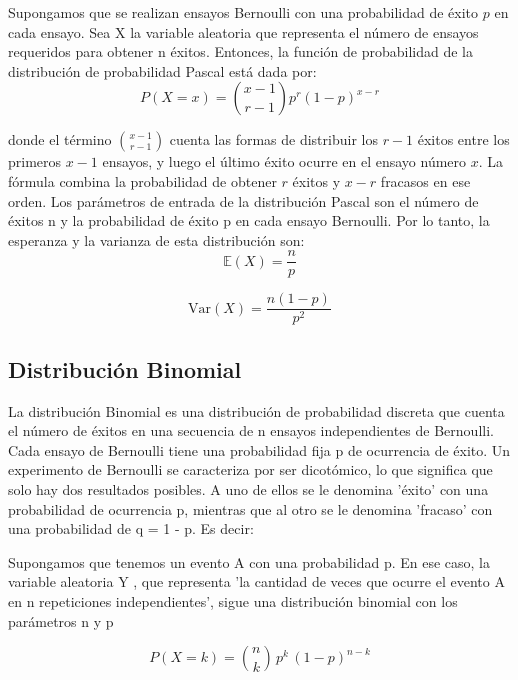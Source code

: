 \documentclass{article}
\begin{document}
 Supongamos que se realizan ensayos Bernoulli con una probabilidad de éxito $p$ en cada ensayo. Sea X la variable aleatoria que representa el número de ensayos requeridos para obtener n éxitos. Entonces, la función de probabilidad de la distribución de probabilidad Pascal está dada por:
\begin{equation}
    P(X = x) = \binom{x - 1}{r - 1} p^r (1 - p)^{x - r}
\end{equation}

donde el término $\binom{x - 1}{r - 1}$ cuenta las formas de distribuir los $r - 1$ éxitos entre los primeros $x - 1$ ensayos, y luego el último éxito ocurre en el ensayo número $x$. La fórmula combina la probabilidad de obtener $r$ éxitos y $x - r$ fracasos en ese orden.
Los parámetros de entrada de la distribución Pascal son el número de éxitos n y la probabilidad de éxito p en cada ensayo Bernoulli. Por lo tanto, la esperanza y la varianza de esta distribución son:
\begin{equation}
    \mathbb{E}(X) = \frac{n}{p}
\end{equation}

\begin{equation}
    \mathrm{Var}(X) = \frac{n(1 - p)}{p^2}
\end{equation}

\subsection{Distribución Binomial}
La distribución Binomial es una distribución de probabilidad discreta que cuenta el número de éxitos en una secuencia de n ensayos independientes de Bernoulli. Cada ensayo de Bernoulli tiene una probabilidad fija p de ocurrencia de éxito. Un experimento de Bernoulli se caracteriza por ser dicotómico, lo que significa que solo hay dos resultados posibles. A uno de ellos se le denomina ’éxito’ con una probabilidad de ocurrencia p, mientras que al otro se le denomina ’fracaso’ con una probabilidad de q = 1 - p. Es decir:

Supongamos que tenemos un evento A con una probabilidad p. En ese caso, la variable aleatoria Y , que representa ’la cantidad de veces que ocurre el evento A en n repeticiones independientes’, sigue una distribución binomial con los parámetros n y p

\begin{equation}
    P(X = k) = \binom{n}{k} \, p^k \, (1 - p)^{n - k}
\end{equation}
\end{document}
